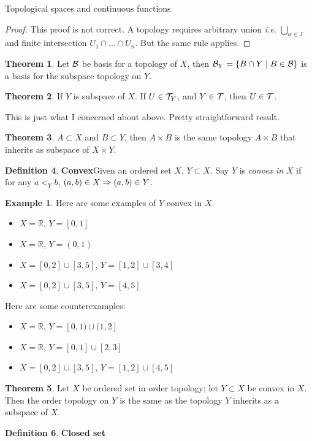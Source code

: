 \documentclass{report}
\theoremstyle{definition}
\newtheorem{theorem}{Theorem}[chapter]
\newtheorem{definition}[theorem]{Definition}
\newtheorem{example}{Example}[theorem]
\newcommand{\defn}[1]{\textbf{#1}\label{#1}\index{#1}}
\newcommand{\set}[1]{\ensuremath\left\{#1\right\}}
\newcommand{\ie}{\textit{i.e.}\xspace}
\newcommand{\RA}{\ensuremath\Rightarrow}
\newcommand{\RR}{\mathbb{R}}
\newcommand{\intersect}{\cap}
\newcommand{\union}{\cup}
\newcommand{\Union}{\bigcup}
\begin{document}
\begin{chapter}{Topological spaces and continuous functions}
\begin{proof}
    This proof is not correct. A topology requires arbitrary union \ie
    $\Union_{\alpha\in J}$ and finite intersection
    $U_1\intersect\dots\intersect U_n$. But the same rule applies.
  \end{proof}
  \begin{theorem}
    Let $\mathcal{B}$ be basis for a topology of $X$, then
    $\B_Y=\set{B\intersect Y\mid B\in\B}$
    is a basis for the subspace topology on $Y$.
  \end{theorem}
  \begin{theorem}
    If $Y$ is subspace of $X$. If $U\in\mathcal{T}_Y$, and $Y\in\mathcal{T}$, then
    $U\in\mathcal{T}$.
  \end{theorem}
  This is just what I concerned about above. Pretty straightforward
  result.
  \begin{theorem}
    $A\subset X$ and $B\subset Y$, then $A\times B$ is the same
    topology $A\times B$ that inherits as subspace of $X\times Y$.
  \end{theorem}
  \begin{definition}\defn{Convex}
    Given an ordered set $X$, $Y\subset X$. Say $Y$ is \emph{convex in
    } $X$ if for any $a<_Yb$, $(a,b)\in X\RA (a,b)\in Y$.
  \end{definition}
  \begin{example} Here are some examples of $Y$ convex in $X$.
    \begin{itemize}
    \item $X=\RR$, $Y=[0,1]$
    \item $X=\RR$, $Y=(0,1)$
    \item $X=[0,2]\union[3,5]$, $Y=[1,2]\union[3,4]$
    \item $X=[0,2]\union[3,5]$, $Y=[4,5]$
    \end{itemize}
    Here are some counterexamples:
    \begin{itemize}
    \item $X=\RR$, $Y=[0,1)\union(1,2]$
    \item $X=\RR$, $Y=[0,1]\union[2,3]$
    \item $X=[0,2]\union[3,5]$, $Y=[1,2]\union[4,5]$
    \end{itemize}
  \end{example}
  \begin{theorem}
    Let $X$ be ordered set in order topology; let $Y\subset X$ be
    convex in $X$. Then the order topology on $Y$ is the same as the
    topology $Y$ inherits as a subspace of $X$.
  \end{theorem}
  \begin{definition}\defn{Closed set}

\end{definition}
\end{chapter}
\end{document}
